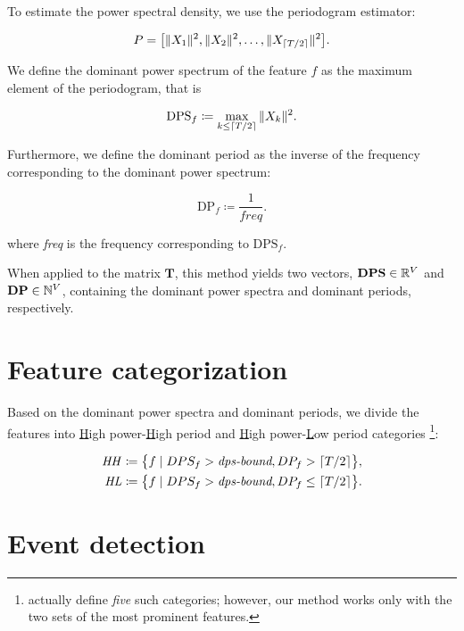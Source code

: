 To estimate the power spectral density, we use the periodogram estimator:

\begin{equation}
	P = \big[\|X_{1}\|^{2}, \|X_{2}\|^{2}, \dots, \|X_{\lceil T / 2\rceil}\|^{2}\big].
\end{equation}

We define the dominant power spectrum of the feature $f$ as the maximum element of the periodogram, that is

\begin{equation}
	\text{DPS}_{f} \coloneqq \max_{k \leq \lceil T/2\rceil}{\|X_{k}\|^{2}}.
\end{equation}

Furthermore, we define the dominant period as the inverse of the frequency corresponding to the dominant power spectrum:

\begin{equation}
	\text{DP}_{f} \coloneqq \frac{1}{\mathit{freq}}.
\end{equation}

where \textit{freq} is the frequency corresponding to $\text{DPS}_{f}$.

When applied to the matrix $\mathbf{T}$, this method yields two vectors, $\mathbf{DPS} \in \mathbb{R}^{V}$ and $\mathbf{DP} \in \mathbb{N}^{V}$, containing the dominant power spectra and dominant periods, respectively.


\section{Feature categorization}
Based on the dominant power spectra and dominant periods, we divide the features into \underline{H}igh power-\underline{H}igh period and \underline{H}igh power-\underline{L}ow period categories \footnote{\cite{event-detection} actually define \textit{five} such categories; however, our method works only with the two sets of the most prominent features.}:

\begin{equation}
\begin{split}
	\mathit{HH} \coloneqq \big\{f \mid DPS_{f} > \textit{dps-bound}, DP_{f} > \lceil T / 2\rceil\big\}, \\
	\mathit{HL} \coloneqq \big\{f \mid DPS_{f} > \textit{dps-bound}, DP_{f} \leq \lceil T / 2\rceil\big\}.
\end{split}
\end{equation}


\section{Event detection}

